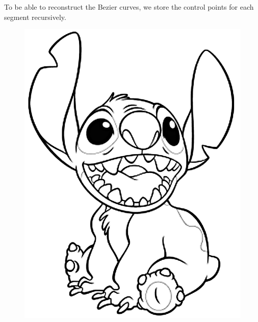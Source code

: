 \documentclass[10pt]{article}
\begin{document}
To be able to reconstruct the Bezier curves, we store the control points for each segment recursively.





\begin{figure}

\centering
\begin{minipage}[t]{.49\textwidth}
\centering
\vspace{0pt}
    \includegraphics[scale=0.3]{disney.jpg}
    \label{fig:cornerdet}
\end{minipage}
\begin{minipage}[t]{.5\textwidth}
\centering
\vspace{0pt}

\end{minipage}
\end{figure}
\end{document}
